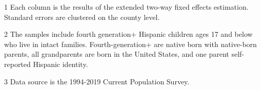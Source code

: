 \begin{table}[H]
{\begin{threeparttable}
\begin{tabular}[t]{lcccccccc}
\end{tabular}
\begin{tablenotes}
\small
\item[1] \footnotesize{Each column is the results of the extended two-way fixed effects estimation. 
                      Standard errors are clustered on the county level.}
\item[2] \footnotesize{The samples include fourth generation+ Hispanic children ages 17 and below who live in intact families. 
                      Fourth-generation+ are native born with native-born parents, all grandparents are born in the United States, and one parent self-reported Hispanic identity.}
\item[3] \footnotesize{Data source is the 1994-2019 Current Population Survey.}
\end{tablenotes}
\end{threeparttable}}
\end{table}
